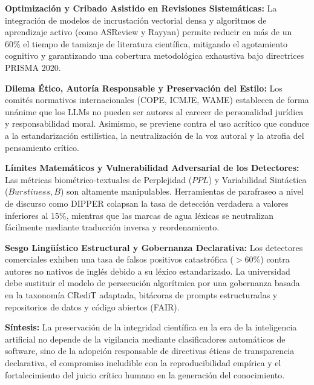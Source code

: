 \vspace{0.25cm}

\begin{resumenlist}[topsep=0.08cm, itemsep=0.08cm, parsep=0pt]
    \item \textbf{Optimización y Cribado Asistido en Revisiones Sistemáticas:} La integración de modelos de incrustación vectorial densa y algoritmos de aprendizaje activo (como ASReview y Rayyan) permite reducir en más de un 60\% el tiempo de tamizaje de literatura científica, mitigando el agotamiento cognitivo y garantizando una cobertura metodológica exhaustiva bajo directrices PRISMA 2020.
    \item \textbf{Dilema Ético, Autoría Responsable y Preservación del Estilo:} Los comités normativos internacionales (COPE, ICMJE, WAME) establecen de forma unánime que los LLMs no pueden ser autores al carecer de personalidad jurídica y responsabilidad moral. Asimismo, se previene contra el uso acrítico que conduce a la estandarización estilística, la neutralización de la voz autoral y la atrofia del pensamiento crítico.
    \item \textbf{Límites Matemáticos y Vulnerabilidad Adversarial de los Detectores:} Las métricas biométrico-textuales de Perplejidad ($PPL$) y Variabilidad Sintáctica ($Burstiness, B$) son altamente manipulables. Herramientas de parafraseo a nivel de discurso como DIPPER colapsan la tasa de detección verdadera a valores inferiores al 15\%, mientras que las marcas de agua léxicas se neutralizan fácilmente mediante traducción inversa y reordenamiento.
    \item \textbf{Sesgo Lingüístico Estructural y Gobernanza Declarativa:} Los detectores comerciales exhiben una tasa de falsos positivos catastrófica ($>60\%$) contra autores no nativos de inglés debido a su léxico estandarizado. La universidad debe sustituir el modelo de persecución algorítmica por una gobernanza basada en la taxonomía CRediT adaptada, bitácoras de prompts estructuradas y repositorios de datos y código abiertos (FAIR).
\end{resumenlist}

\vspace{0.3cm}
\begin{cajabeige}
\textbf{Síntesis:} La preservación de la integridad científica en la era de la inteligencia artificial no depende de la vigilancia mediante clasificadores automáticos de software, sino de la adopción responsable de directivas éticas de transparencia declarativa, el compromiso ineludible con la reproducibilidad empírica y el fortalecimiento del juicio crítico humano en la generación del conocimiento.
\end{cajabeige}

